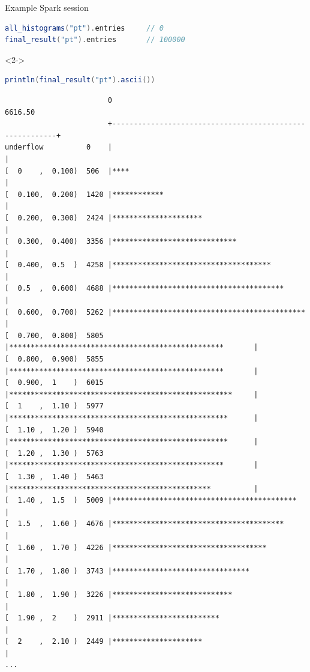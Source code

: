 \documentclass{beamer}
\begin{document}
\begin{frame}[fragile]{Example Spark session}
\begin{lstlisting}[language=scala]
all_histograms("pt").entries     // 0
final_result("pt").entries       // 100000
\end{lstlisting}

\begin{uncoverenv}<2->
\begin{lstlisting}[language=scala]
println(final_result("pt").ascii())
\end{lstlisting}
\tiny
\begin{verbatim}
                        0                                                   6616.50
                        +---------------------------------------------------------+
underflow          0    |                                                         |
[  0    ,  0.100)  506  |****                                                     |
[  0.100,  0.200)  1420 |************                                             |
[  0.200,  0.300)  2424 |*********************                                    |
[  0.300,  0.400)  3356 |*****************************                            |
[  0.400,  0.5  )  4258 |*************************************                    |
[  0.5  ,  0.600)  4688 |****************************************                 |
[  0.600,  0.700)  5262 |*********************************************            |
[  0.700,  0.800)  5805 |**************************************************       |
[  0.800,  0.900)  5855 |**************************************************       |
[  0.900,  1    )  6015 |****************************************************     |
[  1    ,  1.10 )  5977 |***************************************************      |
[  1.10 ,  1.20 )  5940 |***************************************************      |
[  1.20 ,  1.30 )  5763 |**************************************************       |
[  1.30 ,  1.40 )  5463 |***********************************************          |
[  1.40 ,  1.5  )  5009 |*******************************************              |
[  1.5  ,  1.60 )  4676 |****************************************                 |
[  1.60 ,  1.70 )  4226 |************************************                     |
[  1.70 ,  1.80 )  3743 |********************************                         |
[  1.80 ,  1.90 )  3226 |****************************                             |
[  1.90 ,  2    )  2911 |*************************                                |
[  2    ,  2.10 )  2449 |*********************                                    |
...
\end{verbatim}
\end{uncoverenv}
\end{frame}
\end{document}

